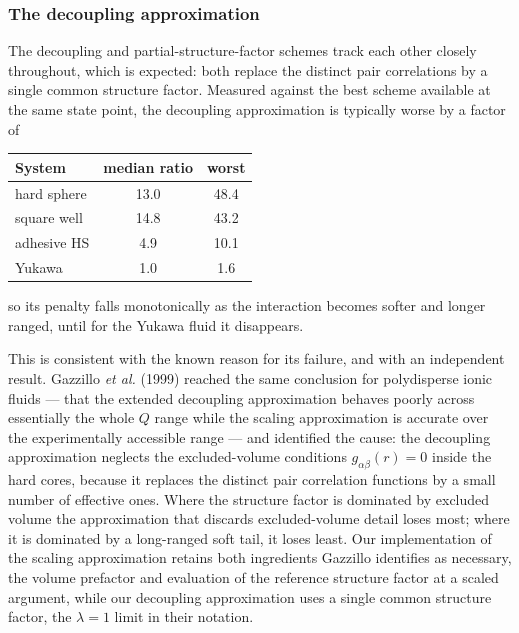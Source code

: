 \subsubsection{The decoupling approximation}

The decoupling and partial-structure-factor schemes track each other closely
throughout, which is expected: both replace the distinct pair correlations by
a single common structure factor. Measured against the best scheme available
at the same state point, the decoupling approximation is typically worse by a
factor of

\begin{center}\small
\begin{tabular}{lcc}
\toprule
System & median ratio & worst\\
\midrule
hard sphere & 13.0 & 48.4\\
square well & 14.8 & 43.2\\
adhesive HS & 4.9 & 10.1\\
Yukawa & 1.0 & 1.6\\
\bottomrule
\end{tabular}
\end{center}

\noindent so its penalty falls monotonically as the interaction becomes softer
and longer ranged, until for the Yukawa fluid it disappears.

This is consistent with the known reason for its failure, and with an
independent result. Gazzillo \emph{et al.} (1999) reached the same conclusion
for polydisperse ionic fluids --- that the extended decoupling approximation
behaves poorly across essentially the whole $Q$ range while the scaling
approximation is accurate over the experimentally accessible range --- and
identified the cause: the decoupling approximation neglects the excluded-volume
conditions $g_{\alpha\beta}(r) = 0$ inside the hard cores, because it
replaces the distinct pair correlation functions by a small number of
effective ones. Where the structure factor is dominated by excluded volume the
approximation that discards excluded-volume detail loses most; where it is
dominated by a long-ranged soft tail, it loses least. Our implementation of
the scaling approximation retains both ingredients Gazzillo identifies as
necessary, the volume prefactor and evaluation of the reference structure
factor at a scaled argument, while our decoupling approximation uses a single
common structure factor, the $\lambda = 1$ limit in their notation.


